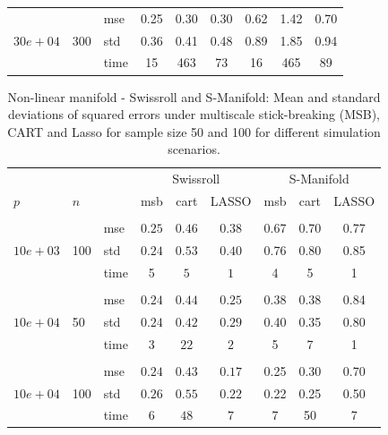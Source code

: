 \begin{table}[t]
\begin{center}
\begin{small}
\begin{sc}
\begin{tabular}{lllcccccc}
\\
\multirow{3}{*}{$30e+04$}&\multirow{3}{*}{300}&mse&0.25&0.30&0.30&0.62&1.42&0.70\\
&&std &0.36&0.41&0.48&0.89&1.85&0.94\\
&&time &15&463&73&16&465&89\\

\hline
\end{tabular}
\end{sc}
\end{small}
\end{center}
\vskip -0.1in
\end{table}



\begin{table}[t]
\caption{Non-linear manifold - Swissroll and S-Manifold: Mean and standard deviations of squared errors under multiscale stick-breaking (MSB), CART and Lasso for sample size 50 and 100 for different simulation scenarios.}\label{table:swiss}
\vskip 0.15in
\begin{center}
\begin{small}
\begin{sc}
\begin{tabular}{lllcccccc}
\hline
&&&\multicolumn{3}{c}{Swissroll}&\multicolumn{3}{c}{S-Manifold}\\

$p$&$n$& & msb&cart& LASSO & msb&cart& LASSO\\
\\
\multirow{3}{*}{$10e+03$}&\multirow{3}{*}{100}&mse &$0.25$&$0.46$&$0.38$&0.67&0.70&0.77\\
&&std & $0.24$ & $0.53$&$0.40$&0.76&0.80&0.85\\
&&time & 5& $5$&$1$&4 & 5 & 1 \\

\\
\multirow{3}{*}{$10e+04$}&\multirow{3}{*}{50}&mse &$0.24$&$0.44$&$0.25$&0.38&0.38&0.84\\
&&std & $0.24$ & $0.42$&$0.29$&0.40&0.35&0.80\\
&&time & 3 & $22$&$2$ &5&7&1\\

\\
\multirow{3}{*}{$10e+04$}&\multirow{3}{*}{100}&mse &$0.24$ & $0.43$&$0.17$&0.25&0.30&0.70\\
&&std & $0.26$&$0.55$&$0.22$&0.22 & 0.25 &0.50\\
&&time&$6$&$48$&$7$&7 & 50 & 7\\


\end{tabular}
\end{sc}
\end{small}
\end{center}
\end{table}
